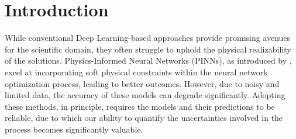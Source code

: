 \documentclass{article}
\begin{document}
\section{Introduction}



While conventional Deep Learning-based approaches provide promising avenues for the scientific domain, they often struggle to uphold the physical realizability of the solutions. Physics-Informed Neural Networks (PINNs), as introduced by \citep{raissi2019physics}, excel at incorporating soft physical constraints within the neural network optimization process, leading to better outcomes. However, due to noisy and limited data, the accuracy of these models can degrade significantly. Adopting these methods, in principle, requires the models and their predictions to be reliable, due to which our ability to quantify the uncertainties involved in the process becomes significantly valuable.

\end{document}
